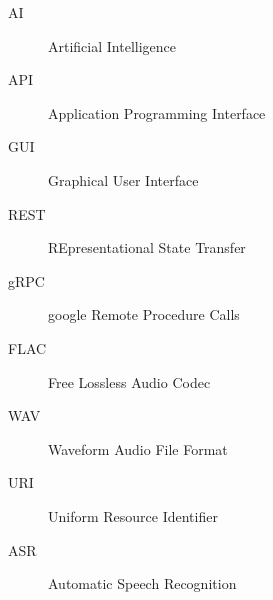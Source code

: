 \documentclass[oneside, 12pt]{book}
\begin{document}
\begin{Glossary}
\begin{description}
  \item[AI]Artificial Intelligence
  \item[API]Application Programming Interface
  \item[GUI]Graphical User Interface
  \item[REST]REpresentational State Transfer
  \item[gRPC]google Remote Procedure Calls
  \item[FLAC]Free Lossless Audio Codec
  \item[WAV]Waveform Audio File Format
  \item[URI]Uniform Resource Identifier
  \item[ASR]Automatic Speech Recognition
\end{description}
\end{Glossary}
\newpage
\nocite{*}
\printbibliography
\lastpageinfo
\end{document}
